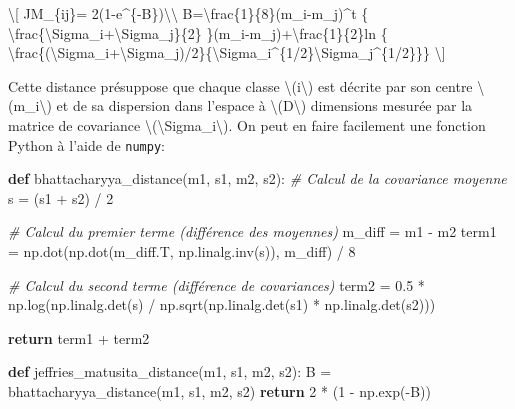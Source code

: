 \documentclass[
]{article}
\newenvironment{Shaded}{}{}
\newcommand{\CommentTok}[1]{\textcolor[rgb]{0.38,0.63,0.69}{\textit{#1}}}
\newcommand{\ControlFlowTok}[1]{\textcolor[rgb]{0.00,0.44,0.13}{\textbf{#1}}}
\newcommand{\DecValTok}[1]{\textcolor[rgb]{0.25,0.63,0.44}{#1}}
\newcommand{\FloatTok}[1]{\textcolor[rgb]{0.25,0.63,0.44}{#1}}
\newcommand{\KeywordTok}[1]{\textcolor[rgb]{0.00,0.44,0.13}{\textbf{#1}}}
\newcommand{\NormalTok}[1]{#1}
\newcommand{\OperatorTok}[1]{\textcolor[rgb]{0.40,0.40,0.40}{#1}}
\begin{document}
{\textbackslash{[} JM\_\{ij\}=
2(1-e\^{}\{-B\})\textbackslash\textbackslash{}
B=\textbackslash frac\{1\}\{8\}(m\_i-m\_j)\^{}t \{
\textbackslash frac\{\textbackslash Sigma\_i+\textbackslash Sigma\_j\}\{2\}
\}(m\_i-m\_j)+\textbackslash frac\{1\}\{2\}ln \{
\textbackslash frac\{\textbar(\textbackslash Sigma\_i+\textbackslash Sigma\_j)/2\textbar\}\{\textbar\textbackslash Sigma\_i\textbar\^{}\{1/2\}\textbar\textbackslash Sigma\_j\textbar\^{}\{1/2\}\}\}
\textbackslash{]}}

Cette distance présuppose que chaque classe
{\textbackslash(i\textbackslash)} est décrite par son centre
{\textbackslash(m\_i\textbackslash)} et de sa dispersion dans l'espace à
{\textbackslash(D\textbackslash)} dimensions mesurée par la matrice de
covariance {\textbackslash(\textbackslash Sigma\_i\textbackslash)}. On
peut en faire facilement une fonction Python à l'aide de \texttt{numpy}:

\label{9630159c}
\label{cb13}
\begin{Shaded}
\begin{Highlighting}[]
\KeywordTok{def}\NormalTok{ bhattacharyya\_distance(m1, s1, m2, s2):}
    \CommentTok{\# Calcul de la covariance moyenne}
\NormalTok{    s }\OperatorTok{=}\NormalTok{ (s1 }\OperatorTok{+}\NormalTok{ s2) }\OperatorTok{/} \DecValTok{2}
    
    \CommentTok{\# Calcul du premier terme (différence des moyennes)}
\NormalTok{    m\_diff }\OperatorTok{=}\NormalTok{ m1 }\OperatorTok{{-}}\NormalTok{ m2}
\NormalTok{    term1 }\OperatorTok{=}\NormalTok{ np.dot(np.dot(m\_diff.T, np.linalg.inv(s)), m\_diff) }\OperatorTok{/} \DecValTok{8}
    
    \CommentTok{\# Calcul du second terme (différence de covariances)}
\NormalTok{    term2 }\OperatorTok{=} \FloatTok{0.5} \OperatorTok{*}\NormalTok{ np.log(np.linalg.det(s) }\OperatorTok{/}\NormalTok{ np.sqrt(np.linalg.det(s1) }\OperatorTok{*}\NormalTok{ np.linalg.det(s2)))}
    
    \ControlFlowTok{return}\NormalTok{ term1 }\OperatorTok{+}\NormalTok{ term2}

\KeywordTok{def}\NormalTok{ jeffries\_matusita\_distance(m1, s1, m2, s2):}
\NormalTok{    B }\OperatorTok{=}\NormalTok{ bhattacharyya\_distance(m1, s1, m2, s2)}
    \ControlFlowTok{return} \DecValTok{2} \OperatorTok{*}\NormalTok{ (}\DecValTok{1} \OperatorTok{{-}}\NormalTok{ np.exp(}\OperatorTok{{-}}\NormalTok{B))}
\end{Highlighting}
\end{Shaded}
\end{document}
